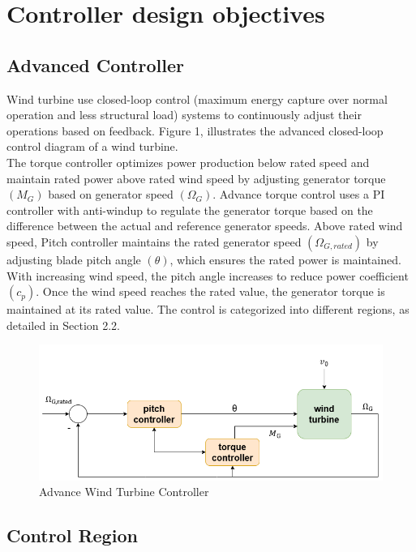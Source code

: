 \chapter{Controller design objectives}
\section{Advanced Controller}

Wind turbine use closed-loop control (maximum energy capture over normal operation and less structural load) systems to continuously adjust their operations based on feedback. Figure 1, illustrates the advanced closed-loop control diagram of a wind turbine. 
\\[16pt]
The torque controller optimizes power production below rated speed and maintain rated power above rated wind speed by adjusting generator torque $(M_G)$ based on generator speed $(\Omega_G)$. Advance torque control uses a PI controller with anti-windup to regulate the generator torque based on the difference between the actual and reference generator speeds. Above rated wind speed, Pitch controller maintains the rated generator speed $(\Omega_{G,rated})$ by adjusting blade pitch angle $(\theta)$, which ensures the rated power is maintained. With increasing wind speed, the pitch angle increases to reduce power coefficient $(c_p)$. Once the wind speed reaches the rated value, the generator torque is maintained at its rated value. The control is categorized into different regions, as detailed in Section 2.2.

\begin{figure}[htbp]
	\centering
	\includegraphics[width=\textwidth]{Figures/Figure_1.png}
	\caption{Advance Wind Turbine Controller}
\end{figure}
 

\section{Control Region}

